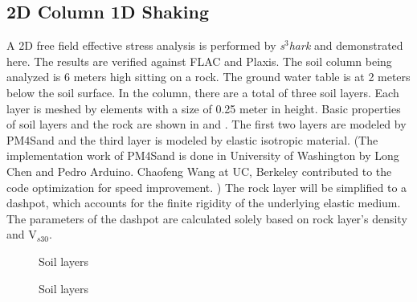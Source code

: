 \subsection{2D Column 1D Shaking}

A 2D free field effective stress analysis is performed by \textit{s$^3$hark}
and demonstrated here.  The results are verified against FLAC and
Plaxis.  The soil column being analyzed is 6 meters high sitting on a
rock.  The ground water table is at 2 meters below the soil surface.
In the column, there are a total of three soil layers. Each layer is
meshed by elements with a size of 0.25 meter in height.  Basic
properties of soil layers and the rock are shown
in  and .  The
first two layers are modeled by PM4Sand and the third layer is modeled
by elastic isotropic material.  (The implementation work of
PM4Sand \cite{boulanger2015pm4sand} is done in University of
Washington by Long Chen and Pedro Arduino.  Chaofeng Wang at UC,
Berkeley contributed to the code optimization for speed improvement. )
The rock layer will be simplified to a \cite{Lysmer:1969} dashpot,
which accounts for the finite rigidity of the underlying elastic
medium.  The parameters of the dashpot are calculated solely based on
rock layer's density and V$_{s30}$.


\begin{figure}[!htbp]
  \caption{Soil layers }
  \label{fig:s3harkSoilColumn}
\end{figure}


\begin{figure}[!htbp]
  \caption{Soil layers }
  \label{fig:s3hark5}
\end{figure}


